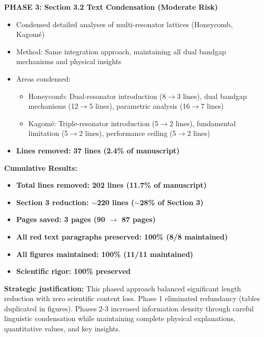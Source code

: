 \documentclass[11pt,a4paper]{article}
\newenvironment{responsebox}{%
    \par\medskip\noindent{\color{responsecolor}\rule{\linewidth}{2pt}}\par
    \noindent{\color{responsecolor}\bfseries Response}\par\smallskip
}{%
    \par\noindent{\color{responsecolor}\rule{\linewidth}{0.5pt}}\medskip
}
\begin{document}
\begin{responsebox}
\textbf{PHASE 3: Section 3.2 Text Condensation (Moderate Risk)}
\begin{itemize}
    \item Condensed detailed analyses of multi-resonator lattices (Honeycomb, Kagom\'{e})
    \item Method: Same integration approach, maintaining all dual bandgap mechanisms and physical insights
    \item Areas condensed:
        \begin{itemize}
            \item Honeycomb: Dual-resonator introduction (8$\rightarrow$3 lines), dual bandgap mechanisms (12$\rightarrow$5 lines), parametric analysis (16$\rightarrow$7 lines)
            \item Kagom\'{e}: Triple-resonator introduction (5$\rightarrow$2 lines), fundamental limitation (5$\rightarrow$2 lines), performance ceiling (5$\rightarrow$2 lines)
        \end{itemize}
    \item \textbf{Lines removed: 37 lines (2.4\% of manuscript)}
\end{itemize}

\textbf{Cumulative Results:}
\begin{itemize}
    \item \textbf{Total lines removed: 202 lines (11.7\% of manuscript)}
    \item \textbf{Section 3 reduction: $\sim$220 lines ($\sim$28\% of Section 3)}
    \item \textbf{Pages saved: 3 pages (90 $\rightarrow$ 87 pages)}
    \item \textbf{All red text paragraphs preserved: 100\% (8/8 maintained)}
    \item \textbf{All figures maintained: 100\% (11/11 maintained)}
    \item \textbf{Scientific rigor: 100\% preserved}
\end{itemize}

\textbf{Strategic justification:} This phased approach balanced significant length reduction with zero scientific content loss. Phase 1 eliminated redundancy (tables duplicated in figures). Phases 2-3 increased information density through careful linguistic condensation while maintaining complete physical explanations, quantitative values, and key insights.
\end{responsebox}
\end{document}
